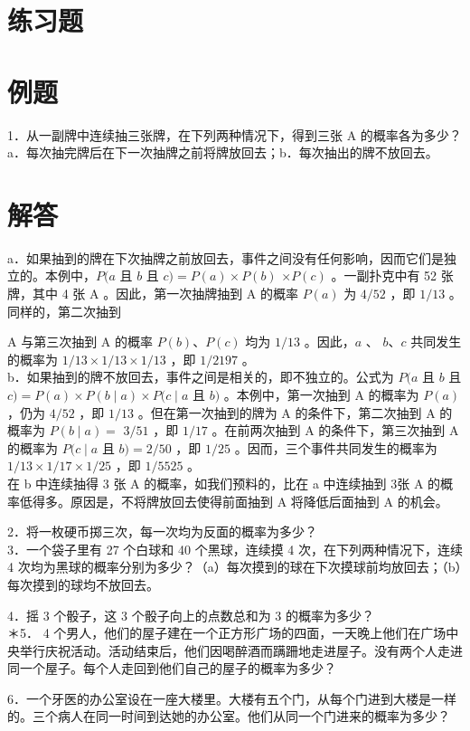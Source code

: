 \section*{练习题}
\section*{例题}
1．从一副牌中连续抽三张牌，在下列两种情况下，得到三张 A 的概率各为多少？a．每次抽完牌后在下一次抽牌之前将牌放回去；b．每次抽出的牌不放回去。

\section*{解答}
a．如果抽到的牌在下次抽牌之前放回去，事件之间没有任何影响，因而它们是独立的。本例中，$P(a$ 且 $b$ 且 $c)=P(a) \times P(b)$ $\times P(c)$ 。一副扑克中有 52 张牌，其中 4 张 A 。因此，第一次抽牌抽到 A 的概率 $P(a)$ 为 $4 / 52$ ，即 $1 / 13$ 。同样的，第二次抽到

A 与第三次抽到 A 的概率 $P(b) 、 P(c)$ 均为 $1 / 13$ 。因此，$a$ 、 $b 、 c$ 共同发生的概率为 $1 / 13 \times 1 / 13 \times 1 / 13$ ，即 $1 / 2197$ 。\\
b．如果抽到的牌不放回去，事件之间是相关的，即不独立的。公式为 $P(a$ 且 $b$ 且 $c)=P(a) \times P(b \mid a) \times P(c \mid a$ 且 $b)$ 。本例中，第一次抽到 A 的概率为 $P(a)$ ，仍为 $4 / 52$ ，即 $1 / 13$ 。但在第一次抽到的牌为 A 的条件下，第二次抽到 A 的概率为 $P(b \mid a)=$ $3 / 51$ ，即 $1 / 17$ 。在前两次抽到 A 的条件下，第三次抽到 A 的概率为 $P(c \mid a$ 且 $b)=2 / 50$ ，即 $1 / 25$ 。因而，三个事件共同发生的概率为 $1 / 13 \times 1 / 17 \times 1 / 25$ ，即 $1 / 5525$ 。\\
在 b 中连续抽得 3 张 A 的概率，如我们预料的，比在 a 中连续抽到 3张 A 的概率低得多。原因是，不将牌放回去使得前面抽到 A 将降低后面抽到 A 的机会。

2．将一枚硬币掷三次，每一次均为反面的概率为多少？\\
3．一个袋子里有 27 个白球和 40 个黑球，连续摸 4 次，在下列两种情况下，连续 4 次均为黑球的概率分别为多少？（a）每次摸到的球在下次摸球前均放回去；（b）每次摸到的球均不放回去。

4．摇 3 个骰子，这 3 个骰子向上的点数总和为 3 的概率为多少？\\
＊5． 4 个男人，他们的屋子建在一个正方形广场的四面，一天晚上他们在广场中央举行庆祝活动。活动结束后，他们因喝醉酒而蹒跚地走进屋子。没有两个人走进同一个屋子。每个人走回到他们自己的屋子的概率为多少？

6．一个牙医的办公室设在一座大楼里。大楼有五个门，从每个门进到大楼是一样的。三个病人在同一时间到达她的办公室。他们从同一个门进来的概率为多少？

